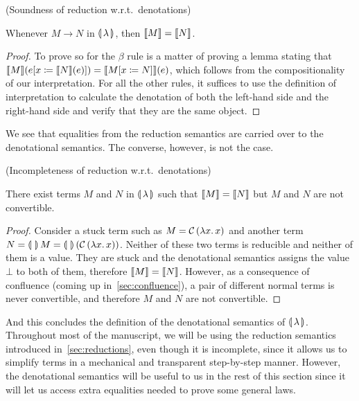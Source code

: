 \begin{observation}
  (Soundness of reduction w.r.t.\ denotations)

  Whenever $M \to N$ in $\llparenthesis \, \lambda \, \rrparenthesis$, then $\llbracket M \rrbracket = \llbracket N \rrbracket$.
\end{observation}

\begin{proof}
  To prove so for the $\beta$ rule is a matter of proving a lemma stating
  that $\llbracket M \rrbracket(e[x \coloneqq \llbracket N \rrbracket(e)]) = \llbracket M[x \coloneqq N] \rrbracket(e)$,
  which follows from the compositionality of our interpretation. For all
  the other rules, it suffices to use the definition of interpretation to
  calculate the denotation of both the left-hand side and the right-hand
  side and verify that they are the same object.
\end{proof}

We see that equalities from the reduction semantics are carried over to the
denotational semantics. The converse, however, is not the case.

\begin{observation}
  (Incompleteness of reduction w.r.t.\ denotations)
  
  There exist terms $M$ and $N$ in $\llparenthesis \, \lambda \, \rrparenthesis$ such that
  $\llbracket M \rrbracket = \llbracket N \rrbracket$ but $M$ and $N$ are not convertible.
\end{observation}

\begin{proof}
  Consider a stuck term such as $M = \mathcal{C}\,(\lambda x.\, x)$ and another
  term $N = \llparenthesis \,  \, \rrparenthesis\,M =
  \llparenthesis \,  \, \rrparenthesis\,(\mathcal{C}\,(\lambda x.\, x))$. Neither of these two terms is
  reducible and neither of them is a value. They are stuck and the
  denotational semantics assigns the value $\bot$ to both of them,
  therefore $\llbracket M \rrbracket = \llbracket N \rrbracket$. However, as a consequence of confluence
  (coming up in~\ref{sec:confluence}), a pair of different normal terms is
  never convertible, and therefore $M$ and $N$ are not convertible.
\end{proof}

And this concludes the definition of the denotational semantics of
$\llparenthesis \, \lambda \, \rrparenthesis$. Throughout most of the manuscript, we will be using the
reduction semantics introduced in~\ref{sec:reductions}, even though it is
incomplete, since it allows us to simplify terms in a mechanical and
transparent step-by-step manner. However, the denotational semantics will
be useful to us in the rest of this section since it will let us access
extra equalities needed to prove some general laws.



